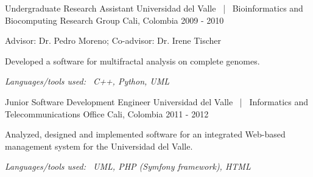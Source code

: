 \vspace{\acvSectionContentTopSkip}
\cventry
{Undergraduate Research Assistant} %
{Universidad del Valle {\normalfont ~|~ Bioinformatics and Biocomputing Research Group}} %
{Cali, Colombia} %
{2009 - 2010} %
{ %
Advisor: Dr. Pedro Moreno; Co-advisor: Dr. Irene Tischer\newline
\vspace{2.0mm}
\textit{}
\vspace{\acvDescAfterDutiesSkip}
\begin{cvitems}
\item {Developed a software for multifractal analysis on complete genomes.}
\end{cvitems}
\vspace{\acvDescAfterDutiesSkip}
\textit{Languages/tools used:~ C++, Python, UML}
}
\vspace{\acvSectionContentTopSkip}


\begin{cventries}
\cventry
{Junior Software Development Engineer} %
{Universidad del Valle {\normalfont ~|~ Informatics and Telecommunications Office}} %
{Cali, Colombia} %
{2011 - 2012} %
{ %
\begin{cvitems}
\item {Analyzed, designed and implemented software for an integrated Web-based management system for the Universidad del Valle.}
\end{cvitems}
\vspace{\acvDescAfterDutiesSkip}
\textit{Languages/tools used:~ UML, PHP (Symfony framework), HTML}
}
\end{cventries}

\vspace{\acvSectionContentTopSkip}

